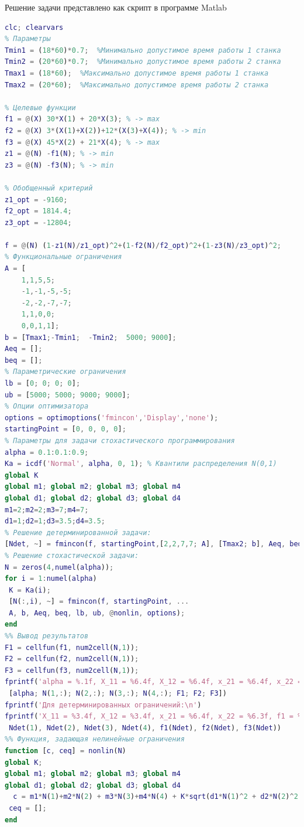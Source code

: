 Решение задачи представлено как скрипт в программе Matlab
\begin{lstlisting}[language={matlab}, caption={Решение задачи стохастического программирования}]
clc; clearvars
% Параметры
Tmin1 = (18*60)*0.7;  %Минимально допустимое время работы 1 станка
Tmin2 = (20*60)*0.7;  %Минимально допустимое время работы 2 станка
Tmax1 = (18*60);  %Максимально допустимое время работы 1 станка
Tmax2 = (20*60);  %Максимально допустимое время работы 2 станка

% Целевые функции
f1 = @(X) 30*X(1) + 20*X(3); % -> max
f2 = @(X) 3*(X(1)+X(2))+12*(X(3)+X(4)); % -> min
f3 = @(X) 45*X(2) + 21*X(4); % -> max
z1 = @(N) -f1(N); % -> min
z3 = @(N) -f3(N); % -> min

% Обобщенный критерий
z1_opt = -9160;
f2_opt = 1814.4;
z3_opt = -12804;

f = @(N) (1-z1(N)/z1_opt)^2+(1-f2(N)/f2_opt)^2+(1-z3(N)/z3_opt)^2;
% Функциональные ограничения
A = [
    1,1,5,5;
    -1,-1,-5,-5;
    -2,-2,-7,-7;
    1,1,0,0;
    0,0,1,1];
b = [Tmax1;-Tmin1;  -Tmin2;  5000; 9000];
Aeq = [];
beq = [];
% Параметрические ограничения
lb = [0; 0; 0; 0];
ub = [5000; 5000; 9000; 9000];
% Опции оптимизатора
options = optimoptions('fmincon','Display','none');
startingPoint = [0, 0, 0, 0];
% Параметры для задачи стохастического программирования
alpha = 0.1:0.1:0.9;
Ka = icdf('Normal', alpha, 0, 1); % Квантили распределения N(0,1)
global K
global m1; global m2; global m3; global m4
global d1; global d2; global d3; global d4
m1=2;m2=2;m3=7;m4=7;
d1=1;d2=1;d3=3.5;d4=3.5;
% Решение детерминированной задачи:
[Ndet, ~] = fmincon(f, startingPoint,[2,2,7,7; A], [Tmax2; b], Aeq, beq, lb, ub, [], options);
% Решение стохастической задачи:
N = zeros(4,numel(alpha));
for i = 1:numel(alpha)
 K = Ka(i);
 [N(:,i), ~] = fmincon(f, startingPoint, ...
 A, b, Aeq, beq, lb, ub, @nonlin, options);
end
%% Вывод результатов
F1 = cellfun(f1, num2cell(N,1));
F2 = cellfun(f2, num2cell(N,1));
F3 = cellfun(f3, num2cell(N,1));
fprintf('alpha = %.1f, X_11 = %6.4f, X_12 = %6.4f, x_21 = %6.4f, x_22 = %6.3f, f1 = %.2f, f2 = %.0f, f3 = %.2f\n', ...
 [alpha; N(1,:); N(2,:); N(3,:); N(4,:); F1; F2; F3])
fprintf('Для детерминированных ограничений:\n')
fprintf('X_11 = %3.4f, X_12 = %3.4f, x_21 = %6.4f, x_22 = %6.3f, f1 = %.2f, f2 = %.0f, f3 = %.2f\n', ...
 Ndet(1), Ndet(2), Ndet(3), Ndet(4), f1(Ndet), f2(Ndet), f3(Ndet))
%% Функция, задающая нелинейные ограничения
function [c, ceq] = nonlin(N)
global K;
global m1; global m2; global m3; global m4
global d1; global d2; global d3; global d4
  c = m1*N(1)+m2*N(2) + m3*N(3)+m4*N(4) + K*sqrt(d1*N(1)^2 + d2*N(2)^2 + d3*N(3)^2 + d4*N(4)^2) - 1200;
 ceq = [];
end
\end{lstlisting}
